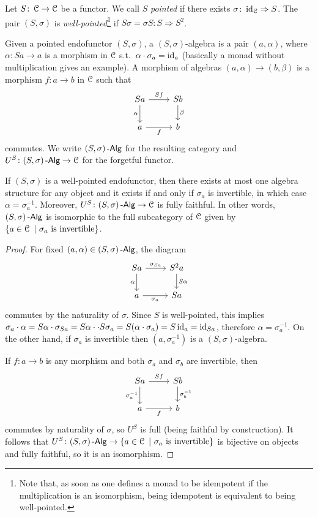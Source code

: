\documentclass[a4paper,11pt,oneside,openany]{scrbook}
\begin{document}
\begin{defn}
	Let $S\colon\operatorname{\mathcal{C}}\to\operatorname{\mathcal{C}}$ be a functor. We call $S$ \emph{pointed} if there
    exists $\sigma\colon\operatorname{id}_{\operatorname{\mathcal{C}}}\Rightarrow S$. The pair $(S,\sigma)$ is
    \emph{well-pointed}\footnote{Note that, as soon as one defines a monad to be
    idempotent if the multiplication is an isomorphism, being idempotent is
    equivalent to being well-pointed.} if $S\sigma=\sigma S\colon S\Rightarrow
    S^2$.
\end{defn}
\begin{defn}
	Given a pointed endofunctor $(S,\sigma)$, a $(S,\sigma)$-algebra is a pair
    $(a,\alpha)$, where $\alpha\colon Sa\to a$ is a morphism in $\operatorname{\mathcal{C}}$ s.t.\
    $\alpha\cdot\sigma_a=\operatorname{id}_a$ (basically a monad without multiplication gives
    an example). A morphism of algebras $(a,\alpha)\to(b,\beta)$ is a morphism
    $f\colon a\to b$ in $\operatorname{\mathcal{C}}$ such that
	\[
		\begin{tikzcd}
			Sa\arrow["\alpha"']{d}\arrow["Sf"]{r}
			& Sb\arrow["\beta"]{d} \\
			a\arrow["f"']{r}
			& b
		\end{tikzcd}
	\]
	commutes. We write $(S,\sigma)\operatorname{-\mathsf{Alg}}$ for the resulting category and $U^S\colon(S,\sigma)\operatorname{-\mathsf{Alg}}\to\operatorname{\mathcal{C}}$ for the forgetful functor.
\end{defn}
\begin{lemma}
	If $(S,\sigma)$ is a well-pointed endofunctor, then there exists at most one algebra structure for any object and it exists if and only if $\sigma_a$ is invertible, in which case $\alpha=\sigma_a^{-1}$. Moreover, $U^S\colon(S,\sigma)\operatorname{-\mathsf{Alg}}\to\operatorname{\mathcal{C}}$ is fully faithful. In other words, $(S,\sigma)\operatorname{-\mathsf{Alg}}$ is isomorphic to the full subcategory of $\operatorname{\mathcal{C}}$ given by $\{a\in\operatorname{\mathcal{C}}\ |\ \sigma_a \ \text{is invertible} \}$.
\end{lemma}
\begin{proof}
	For fixed $(a,\alpha)\in(S,\sigma)\operatorname{-\mathsf{Alg}}$, the diagram
	\[
		\begin{tikzcd}
			Sa\arrow["\alpha"']{d}\arrow["\sigma_{Sa}"]{r}
			& S^2a\arrow["S\alpha"]{d} \\
			a\arrow["\sigma_a"']{r}
			& Sa
		\end{tikzcd}
	\]
	commutes by the naturality of $\sigma$. Since $S$ is well-pointed, this
    implies $\sigma_a\cdot\alpha=S\alpha\cdot\sigma_{Sa}=S\alpha\cdot
    \cdot S\sigma_a=S(\alpha\cdot\sigma_a)=S\operatorname{id}_a=\operatorname{id}_{Sa}$, therefore
    $\alpha=\sigma_a^{-1}$. On the other hand, if $\sigma_a$ is invertible then
    $(a,\sigma_a^{-1})$ is a $(S,\sigma)$-algebra.

	If $f\colon a\to b$ is any morphism and both $\sigma_a$ and $\sigma_b$ are invertible, then
	\[
		\begin{tikzcd}
			Sa\arrow["\sigma_a^{-1}"']{d}\arrow["Sf"]{r}
			& Sb\arrow["\sigma_b^{-1}"]{d} \\
			a\arrow["f"']{r}
			& b
		\end{tikzcd}
	\]
	commutes by naturality of $\sigma$, so $U^S$ is full (being faithful by construction). It follows that $U^S\colon(S,\sigma)\Alg\to\{a\in\C\ |\ \sigma_a \ \text{is invertible}\}$ is bijective on objects and fully faithful, so it is an isomorphism.
\end{proof}
\end{document}
